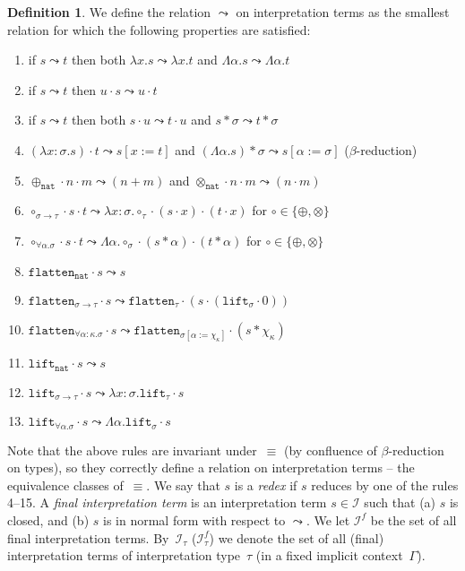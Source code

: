 \documentclass[a4paper,UKenglish,cleveref,autoref,numberwithinsect]{lipics-v2019}
\theoremstyle{definition}
\newtheorem{defn}[theorem]{Definition}
\newcommand{\Iterms}{\mathcal{I}}
\newcommand{\arrtype}{\rightarrow}
\newcommand{\quant}[2]{\forall #1.#2}
\newcommand{\app}[2]{#1 \cdot #2}
\newcommand{\tapp}[2]{#1 * #2}
\newcommand{\subst}[2]{#1:=#2}
\newcommand{\abs}[2]{\lambda #1.#2}
\newcommand{\tabs}[2]{\Lambda #1.#2}
\newcommand{\arrW}{\leadsto}
\newcommand{\nat}{\mathtt{nat}}
\newcommand{\flatten}{\mathtt{flatten}}
\newcommand{\lift}{\mathtt{lift}}
\begin{document}
\begin{defn}
  We define the relation $\arrW$ on interpretation terms as the
  smallest relation for which the following properties are satisfied:
  \begin{enumerate}
  \item\label{arrW:mono:abs}
    if $s \arrW t$ then both $\abs{x}{s} \arrW \abs{x}{t}$ and
    $\tabs{\alpha}{s} \arrW \tabs{\alpha}{t}$
  \item\label{arrW:mono:right}
    if $s \arrW t$ then $\app{u}{s} \arrW \app{u}{t}$
  \item\label{arrW:mono:left}
    if $s \arrW t$ then both $\app{s}{u} \arrW \app{t}{u}$ and
    $\tapp{s}{\sigma} \arrW \tapp{t}{\sigma}$
  \item\label{arrW:beta:abs} $\app{(\abs{x:\sigma}{s})}{t} \arrW
    s[\subst{x}{t}]$
    and
    $\tapp{(\tabs{\alpha}{s})}{\sigma}
    \arrW s[\subst{\alpha}{\sigma}]$
    ($\beta$-reduction)
  \item\label{arrW:plus:base}
    $\app{\app{\oplus_{\nat}}{n}}{m} \arrW (n+m)$
    and
    $\app{\app{\otimes_{\nat}}{n}}{m}
    \arrW (n \cdot m)$
  \item\label{arrW:circ:arrow} $\app{\app{\circ_{\sigma \arrtype
        \tau}}{s}}{t} \arrW
    \abs{x:\sigma}{\app{\app{\circ_\tau}{(\app{s}{x})}}{(\app{t}{x})}}$
    for $\circ \in \{ \oplus, \otimes \}$
  \item\label{arrW:circ:forall}
    $\app{\app{\circ_{\quant{\alpha}{\sigma}}}{s}}{t} \arrW
    \tabs{\alpha}{\app{\app{\circ_\sigma}{(\tapp{s}{\alpha})}}{(
        \tapp{t}{\alpha})}}$ for $\circ \in \{ \oplus, \otimes \}$
  \item $\app{\flatten_\nat}{s} \arrW s$
  \item $\app{\flatten_{\sigma \arrtype \tau}}{s} \arrW
    \app{\flatten_\tau}{(\app{s}{(\app{\lift_\sigma}{0})})}$
  \item $\app{\flatten_{\quant{\alpha:\kappa}{\sigma}}}{s} \arrW
    \app{\flatten_{\sigma[\subst{\alpha}{\chi_\kappa}]}}{(\tapp{s}{\chi_\kappa})}$
  \item $\app{\lift_\nat}{s} \arrW s$
  \item $\app{\lift_{\sigma \arrtype \tau}}{s} \arrW
    \abs{x:\sigma}{\app{\lift_{\tau}}{s}}$
  \item $\app{\lift_{\quant{\alpha}{\sigma}}}{s} \arrW
    \tabs{\alpha}{\app{\lift_{\sigma}}{s}}$
  \end{enumerate}
  Note that the above rules are invariant under~$\equiv$ (by
  confluence of $\beta$-reduction on types), so they correctly define
  a relation on interpretation terms -- the equivalence classes
  of~$\equiv$. We say that $s$ is a \emph{redex} if $s$ reduces by one
  of the rules 4--15.
%
  A \emph{final interpretation term} is an interpretation term $s \in
  \Iterms$ such that (a) $s$ is closed, and (b) $s$ is in normal form
  with respect to $\arrW$.  We let $\Iterms^f$ be the set of all final
  interpretation terms. By~$\Iterms_\tau$ ($\Iterms^f_\tau$) we denote
  the set of all (final) interpretation terms of interpretation
  type~$\tau$ (in a fixed implicit context~$\Gamma$).
\end{defn}
\end{document}
